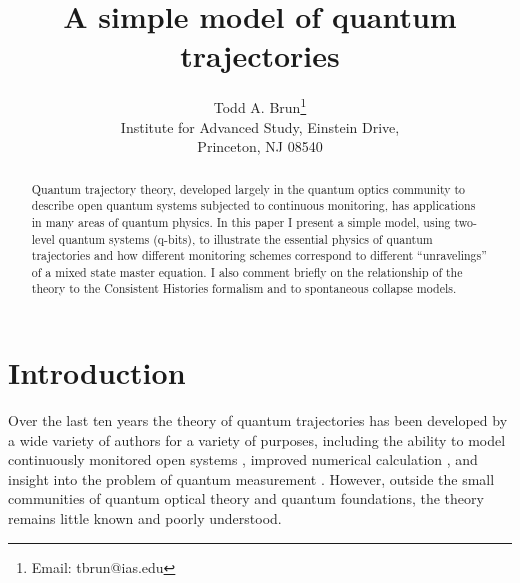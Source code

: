 

\def\bra#1{{\langle #1 |}}
\def\ket#1{{| #1 \rangle}}
\def\bracket#1#2{{\langle #1 | #2 \rangle}}
\def\expect#1{{\langle #1 \rangle}}
\def\sx{{\hat\sigma_x}}
\def\sy{{\hat\sigma_y}}
\def\sz{{\hat\sigma_z}}
\def\svec{{\hat{\vec\sigma}}}
\def\nvec{{\vec n}}
\def\id{{\hat 1}}
\def\e{{\rm e}}
\def\tr{{\rm Tr}}
\def\H{{\hat H}}
\def\U{{\hat U}}
\def\Udag{{\hat U^\dagger}}
\def\O{{\hat O}}
\def\Odag{{\hat O^\dagger}}
\def\P{{\hat{\cal P}}}
\def\E{{\hat E}}
\def\A{{\hat A}}
\def\Adag{{\hat A^\dagger}}
\def\B{{\hat B}}
\def\Bdag{{\hat B^\dagger}}
\def\L{{\hat L}}
\def\Ldag{{\hat L^\dagger}}
\def\Z{{\hat Z}}



\title{A simple model of quantum trajectories}

\author{Todd A. Brun\thanks{Email:  tbrun@ias.edu} \\
Institute for Advanced Study, Einstein Drive, \\
Princeton, NJ  08540 }

\maketitle

\begin{abstract}
Quantum trajectory theory, developed largely in the quantum optics
community to describe open quantum systems subjected to continuous
monitoring, has applications in many areas of quantum physics.
In this paper I present a simple model, using two-level quantum
systems (q-bits), to illustrate the essential physics of quantum
trajectories and how different monitoring schemes correspond to different
``unravelings'' of a mixed state master equation.
I also comment briefly on the relationship of the
theory to the Consistent Histories formalism and to spontaneous collapse
models.
\end{abstract}

\section{Introduction}

Over the last ten years the theory of quantum trajectories has been
developed by a wide variety of authors
\cite{Carmichael,Dalibard,Dum,Gardiner,Gisin1,Diosi,Gisin2,Schack}
for a variety of purposes,
including the ability to model continuously monitored open systems
\cite{Carmichael,Dum,Gardiner}, improved numerical calculation
\cite{Dalibard,Schack}, and insight into the problem
of quantum measurement \cite{Gisin1,Diosi,Gisin2}.
However, outside the small communities of quantum optical
theory and quantum foundations, the theory remains little known and
poorly understood.

